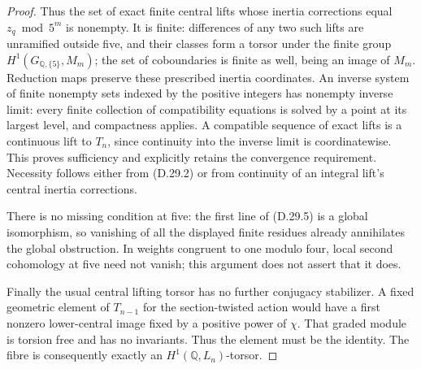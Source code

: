 \begin{proof}
Thus the set of exact finite central
lifts whose inertia corrections equal
\(z_q\bmod5^m\) is nonempty. It is
finite: differences of any two such
lifts are unramified outside five,
and their classes form a torsor under
the finite group
\(H^1(G_{\mathbb Q,\{5\}},M_m)\);
the set of coboundaries is finite as
well, being an image of \(M_m\).
Reduction maps preserve these prescribed
inertia coordinates. An inverse system
of finite nonempty sets indexed by
the positive integers has nonempty
inverse limit: every finite collection
of compatibility equations is solved
by a point at its largest level, and
compactness applies. A compatible
sequence of exact lifts is a continuous
lift to \(T_n\), since continuity into
the inverse limit is coordinatewise.
This proves sufficiency and explicitly
retains the convergence requirement.
Necessity follows either from (D.29.2)
or from continuity of an integral
lift's central inertia corrections.

There is no missing condition at five:
the first line of (D.29.5) is a global
isomorphism, so vanishing of all the
displayed finite residues already
annihilates the global obstruction.
In weights congruent to one modulo
four, local second cohomology at five
need not vanish; this argument does
not assert that it does.

Finally the usual central lifting
torsor has no further conjugacy
stabilizer. A fixed geometric element
of \(T_{n-1}\) for the section-twisted
action would have a first nonzero
lower-central image fixed by a positive
power of \(\chi\). That graded module
is torsion free and has no invariants.
Thus the element must be the identity.
The fibre is consequently exactly an
\(H^1(\mathbb Q,L_n)\)-torsor.
\end{proof}

